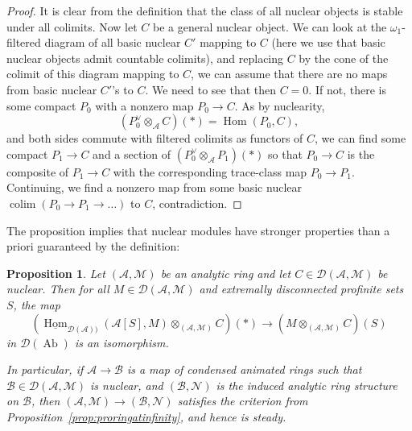 \documentclass[11pt]{amsbook}
\DeclareMathOperator{\Hom}{Hom}
\newcommand{\intHom}{\underline{\Hom}}
\DeclareMathOperator{\Ab}{Ab}
\DeclareMathOperator{\colim}{colim}
\numberwithin{equation}{section}
\numberwithin{theorem}{section}
\newtheorem{proposition}[theorem]{Proposition}
\theoremstyle{definition}
\begin{document}
\begin{proof}
It is clear from the definition that the class of all nuclear objects is stable under all colimits. Now let $C$ be a general nuclear object. We can look at the $\omega_1$-filtered diagram of all basic nuclear $C'$ mapping to $C$ (here we use that basic nuclear objects admit countable colimits), and replacing $C$ by the cone of the colimit of this diagram mapping to $C$, we can assume that there are no maps from basic nuclear $C'$'s to $C$. We need to see that then $C=0$. If not, there is some compact $P_0$ with a nonzero map $P_0\to C$. As by nuclearity,
\[
(P_0^\vee\otimes_{\mathcal A} C)(\ast) = \Hom(P_0,C),
\]
and both sides commute with filtered colimits as functors of $C$, we can find some compact $P_1\to C$ and a section of $(P_0^\vee\otimes_{\mathcal A} P_1)(\ast)$ so that $P_0\to C$ is the composite of $P_1\to C$ with the corresponding trace-class map $P_0\to P_1$. Continuing, we find a nonzero map from some basic nuclear $\colim(P_0\to P_1\to\ldots)$ to $C$, contradiction.
\end{proof}

The proposition implies that nuclear modules have stronger properties than a priori guaranteed by the definition:

\begin{proposition}\label{prop:nuclearsteady} Let $(\mathcal A,\mathcal M)$ be an analytic ring and let $C\in \mathcal D(\mathcal A,\mathcal M)$ be nuclear. Then for all $M\in \mathcal D(\mathcal A,\mathcal M)$ and extremally disconnected profinite sets $S$, the map
\[
(\intHom_{\mathcal D(\mathcal A))}(\mathcal A[S],M)\otimes_{(\mathcal A,\mathcal M)} C)(\ast)\to (M\otimes_{(\mathcal A,\mathcal M)} C)(S)
\]
in $\mathcal D(\Ab)$ is an isomorphism.

In particular, if $\mathcal A\to \mathcal B$ is a map of condensed animated rings such that $\mathcal B\in \mathcal D(\mathcal A,\mathcal M)$ is nuclear, and $(\mathcal B,\mathcal N)$ is the induced analytic ring structure on $\mathcal B$, then $(\mathcal A,\mathcal M)\to (\mathcal B,\mathcal N)$ satisfies the criterion from Proposition~\ref{prop:proringatinfinity}, and hence is steady.
\end{proposition}
\end{document}
